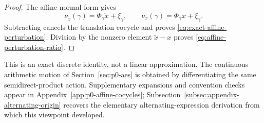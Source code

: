 \begin{proof}
The affine normal form gives
\[
  \nu_{\widetilde x}(\gamma)=\Phi_\gamma\widetilde x+\xi_\gamma,
  \qquad
  \nu_x(\gamma)=\Phi_\gamma x+\xi_\gamma.
\]
Subtracting cancels the translation cocycle and proves
\eqref{eq:exact-affine-perturbation}.  Division by the nonzero element
$\widetilde x-x$ proves \eqref{eq:affine-perturbation-ratio}.
\end{proof}

This is an exact discrete identity, not a linear approximation.  The
continuous arithmetic motion of Section~\ref{sec:p0-aes} is obtained by
differentiating the same semidirect-product action.  Supplementary expansions
and convention checks appear in Appendix~\ref{app:p0-affine-cocycles};
Subsection~\ref{subsec:appendix-alternating-origin} recovers the elementary
alternating-expression derivation from which this viewpoint developed.
